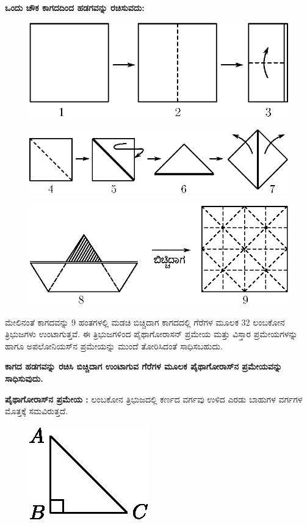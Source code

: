 \eject
\textbf{ಒಂದು ಚೌಕ ಕಾಗದದಿಂದ ಹಡಗವನ್ನು ರಚಿಸುವದು:}
\begin{figure}[H]
\centering
\includegraphics[scale=.98]{src/figure/chap1/fig1-17a.eps}
\end{figure}
\begin{figure}[H]
\centering
\includegraphics[scale=.98]{src/figure/chap1/fig1-17b.eps}
\end{figure}
\begin{figure}[H]
\centering
\includegraphics[scale=.98]{src/figure/chap1/fig1-17c.eps}
\end{figure}

ಮೇಲಿನಂತೆ ಕಾಗದವನ್ನು 9 ಹಂತಗಳಲ್ಲಿ ಮಡಚಿ ಬಿಚ್ಚಿದಾಗ ಕಾಗದದಲ್ಲಿ ಗೆರೆಗಳ ಮೂಲಕ 32 ಲಂಬಕೋನ ತ್ರಿಭುಜಗಳು ಉಂಟಾಗುತ್ತವೆ. ಈ ತ್ರಿಭುಜಗಳಿಂದ ಪೈಥಾಗೋರಾಸನ್ ಪ್ರಮೇಯ ಮತ್ತು ವಿಸ್ತಾರ ಪ್ರಮೇಯಗಳನ್ನು ಹಾಗೂ ಅಪಲೋನಿಯಸ್‌ನ ಪ್ರಮೇಯನ್ನು ಮುಂದೆ ತೋರಿಸಿದಂತೆ ಸಾಧಿಸಬಹುದು. 

\textbf{ಕಾಗದ ಹಡಗವನ್ನು ರಚಿಸಿ ಬಿಚ್ಚಿದಾಗ ಉಂಟಾಗುವ ಗೆರೆಗಳ ಮೂಲಕ ಪೈಥಾಗೋರಾಸ್‌ನ ಪ್ರಮೇಯವನ್ನು ಸಾಧಿಸುವುದು.}

\noindent
\textbf{ಪೈಥಾಗೋರಾಸ್‌ನ ಪ್ರಮೇಯ :} ಲಂಬಕೋನ ತ್ರಿಭುಜದಲ್ಲಿ ಕರ್ಣದ ವರ್ಗವು ಉಳಿದ ಎರಡು ಬಾಹುಗಳ ವರ್ಗಗಳ ಮೊತ್ತಕ್ಕೆ ಸಮವಿರುತ್ತದೆ. 
\begin{figure}[H]
\centering
\includegraphics{src/figure/chap1/fig1-17d.eps}
\end{figure}

